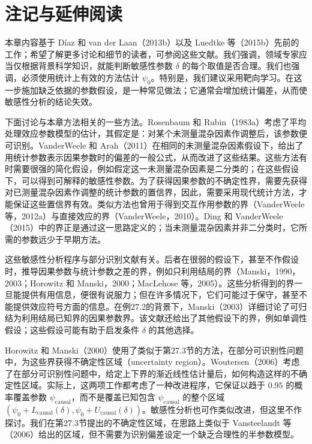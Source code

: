 \section{注记与延伸阅读}

本章内容基于 Díaz 和 van der Laan（2013b）以及 Luedtke 等（2015b）先前的工作；希望了解更多讨论和细节的读者，可参阅这些文献。我们强调，领域专家应当仅根据背景科学知识，就能判断敏感性参数 $\delta$ 的每个取值是否合理。我们也强调，必须使用统计上有效的方法估计 $\psi_0$。特别是，我们建议采用靶向学习。在这一步施加缺乏依据的参数假设，是一种常见做法；它通常会增加统计偏差，从而使敏感性分析的结论失效。

下面讨论与本章方法相关的一些方法。Rosenbaum 和 Rubin（1983a）考虑了平均处理效应参数模型的估计，其假定是：对某个未测量混杂因素作调整后，该参数便可识别。VanderWeele 和 Arah（2011）在相同的未测量混杂因素假设下，给出了用统计参数表示因果参数时的偏差的一般公式，从而改进了这些结果。这些方法有时需要很强的简化假设，例如假定这一未测量混杂因素是二分类的；在这些假设下，可以得到可解释的敏感性参数。为了获得因果参数的不确定性界，需要先获得对已测量混杂因素作调整的统计参数的置信界，因此，需要采用现代统计方法，才能保证这些置信界有效。类似方法也曾用于得到交互作用参数的界（VanderWeele 等，2012a）与直接效应的界（VanderWeele，2010）。Ding 和 VanderWeele（2015）中的界正是通过这一思路定义的；当未测量混杂因素并非二分类时，它所需的参数远少于早期方法。

这些敏感性分析程序与部分识别文献有关。后者在很弱的假设下，甚至不作假设时，推导因果参数与统计参数之差的界，例如只利用结局的界（Manski，1990，2003；Horowitz 和 Manski，2000；MacLehose 等，2005）。这些分析得到的界一旦能提供有用信息，便很有说服力；但在许多情况下，它们可能过于保守，甚至不能提供效应符号方面的信息。在例27.2的背景下，Manski（2003）详细讨论了可归结为利用结局已知界的因果参数界。该文献还给出了其他假设下的界，例如单调性假设；这些假设可能有助于启发条件 $\delta$ 的其他选择。

Horowitz 和 Manski（2000）使用了类似于第27.3节的方法，在部分可识别性问题中，为这些界获得不确定性区域（uncertainty region）。Woutersen（2006）考虑了在部分可识别性问题中，给定上下界的渐近线性估计量后，如何构造这样的不确定性区域。实际上，这两项工作都考虑了一种改进程序，它保证以趋于 $0.95$ 的概率覆盖参数 $\psi_{\mathrm{causal}}$，而不是覆盖已知包含 $\psi_{\mathrm{causal}}$ 的整个区域 $(\psi_0+L_{\mathrm{causal}}(\delta),\psi_0+U_{\mathrm{causal}}(\delta))$。敏感性分析也可作类似改进，但这里不作探讨。我们在第27.3节提出的不确定性区域，在思路上类似于 Vansteelandt 等（2006）给出的区域，但不需要为识别偏差设定一个缺乏合理性的半参数模型。
